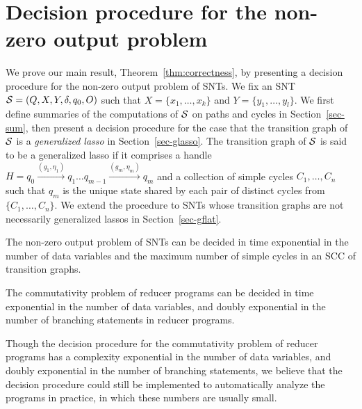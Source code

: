 
\section{Decision procedure for the non-zero output problem}\label{sec:dec-snt}
%
We prove our main result, Theorem~\ref{thm:correctness}, by presenting a decision procedure for the non-zero output problem of SNTs. We fix an SNT ${\mathcal{S} } = (Q,X,Y,\delta,q_0,O)$ such that $X=\{ x_1,\dots, x_k\}$ and $Y = \{y_1,\dots,y_l\}$. 
We first define summaries of the computations of ${\mathcal{S} }$ on paths and cycles in Section~\ref{sec-sum}, then present a decision procedure for the case that the transition graph of ${\mathcal{S} }$ is a \emph{generalized lasso} in Section~\ref{sec-glasso}. The transition graph of ${\mathcal{S} }$ is said to be a generalized lasso if it comprises a handle $H=q_0 \xrightarrow{(g_1,\eta_1)} q_1 \dots q_{m-1} \xrightarrow{(g_m,\eta_m)} q_{m}$ and a collection of simple cycles $C_1,\dots,C_n$ such that $q_m$ is the unique state shared by each pair of distinct cycles from $\{C_1,\dots,C_n\}$. We extend the procedure to SNTs whose transition graphs are not necessarily generalized lassos in Section~\ref{sec-gflat}. 


\begin{theorem}\label{thm:correctness}
The non-zero output problem of SNTs can be decided in time exponential in the number of data variables and the maximum number of simple cycles in an SCC of transition graphs.
\end{theorem}
\vspace{-2mm}

\begin{corollary}\label{cor:snt-dec-proc}
The commutativity problem of  reducer programs can be decided in time exponential in the number of data variables, and doubly exponential in the number of branching statements in reducer programs. 
\end{corollary}

\begin{remark}
Though the decision procedure for the commutativity problem of reducer programs has a complexity exponential in the number of data variables, and doubly exponential in the number of branching statements, we believe that the decision procedure could still be implemented to automatically analyze the programs in practice, in which these numbers are usually small. 
\end{remark}



